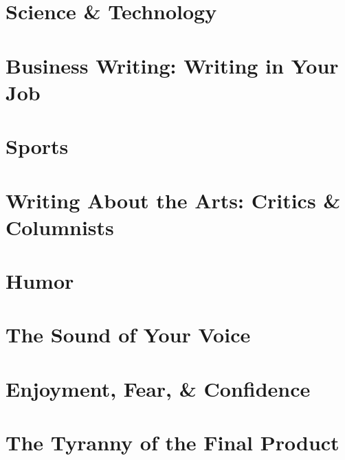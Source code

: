 \documentclass{article}
\begin{document}
\section{Science \& Technology}


\section{Business Writing: Writing in Your Job}


\section{Sports}


\section{Writing About the Arts: Critics \& Columnists}


\section{Humor}


\section{The Sound of Your Voice}


\section{Enjoyment, Fear, \& Confidence}


\section{The Tyranny of the Final Product}
\end{document}

